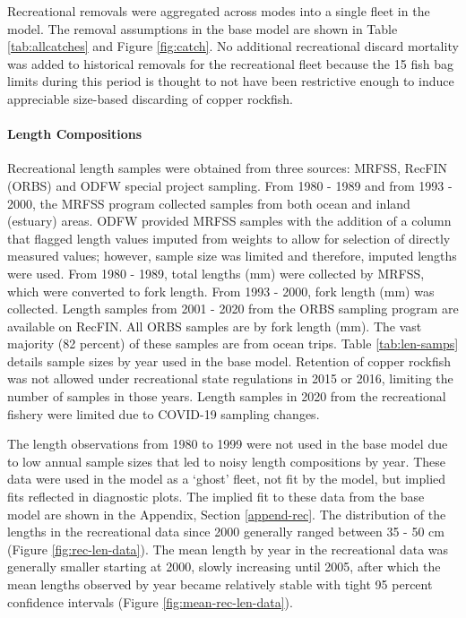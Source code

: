 \documentclass[11pt,
  english,
  a4paper,
]{article}
\begin{document}
Recreational removals were aggregated across modes into a single fleet in the model. The removal assumptions in the base model are shown in Table \ref{tab:allcatches} and Figure \ref{fig:catch}. No additional recreational discard mortality was added to historical removals for the recreational fleet because the 15 fish bag limits during this period is thought to not have been restrictive enough to induce appreciable size-based discarding of copper rockfish.

\leavevmode\tagmcend\tagstructend\par


\hypertarget{length-compositions}{%
\paragraph{Length Compositions}\label{length-compositions}}

\leavevmode\tagmcend\tagstructend


Recreational length samples were obtained from three sources: MRFSS, RecFIN (ORBS) and ODFW special project sampling. From 1980 - 1989 and from 1993 - 2000, the MRFSS program collected samples from both ocean and inland (estuary) areas. ODFW provided MRFSS samples with the addition of a column that flagged length values imputed from weights to allow for selection of directly measured values; however, sample size was limited and therefore, imputed lengths were used. From 1980 - 1989, total lengths (mm) were collected by MRFSS, which were converted to fork length. From 1993 - 2000, fork length (mm) was collected. Length samples from 2001 - 2020 from the ORBS sampling program are available on RecFIN. All ORBS samples are by fork length (mm). The vast majority (82 percent) of these samples are from ocean trips. Table \ref{tab:len-samps} details sample sizes by year used in the base model. Retention of copper rockfish was not allowed under recreational state regulations in 2015 or 2016, limiting the number of samples in those years. Length samples in 2020 from the recreational fishery were limited due to COVID-19 sampling changes.

\leavevmode\tagmcend\tagstructend\par


The length observations from 1980 to 1999 were not used in the base model due to low annual sample sizes that led to noisy length compositions by year. These data were used in the model as a `ghost' fleet, not fit by the model, but implied fits reflected in diagnostic plots. The implied fit to these data from the base model are shown in the Appendix, Section \ref{append-rec}. The distribution of the lengths in the recreational data since 2000 generally ranged between 35 - 50 cm (Figure \ref{fig:rec-len-data}). The mean length by year in the recreational data was generally smaller starting at 2000, slowly increasing until 2005, after which the mean lengths observed by year became relatively stable with tight 95 percent confidence intervals (Figure \ref{fig:mean-rec-len-data}).
\end{document}
